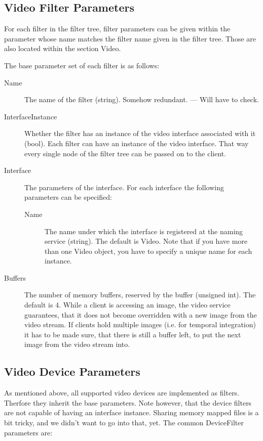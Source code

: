 \subsection{Video Filter Parameters}

For each filter in the filter tree, filter parameters can be given
within the parameter whose name matches the filter name given in the
filter tree. Those are also located within the section Video.

The base parameter set of each filter is as follows:

\begin{description}
\item[Name] The name of the filter (string).
  Somehow redundant. --- Will have to check.
\item[InterfaceInstance] Whether the filter has an instance of the
  video interface associated with it (bool).
  Each filter can have an instance of the video interface. That way
  every single node of the filter tree can be passed on to the client.
\item[Interface] The parameters of the interface. For each interface
  the following parameters can be specified:
  \begin{description}
  \item[Name] The name under which the interface is registered at the
    naming service (string). The default is Video. Note that if
    you have more than one Video object, you have to specify a unique
    name for each instance.
  \end{description}
\item[Buffers] The number of memory buffers, reserved by the buffer
  (unsigned int). The default is 4. While a client is accessing an
  image, the video service guarantees, that it does not become
  overridden with a new image from the video stream. If clients hold
  multiple images (i.e. for temporal integration) it has to be made
  sure, that there is still a buffer left, to put the next image from
  the video stream into.
\end{description}

\subsection{Video Device Parameters}

As mentioned above, all supported video devices are implemented as
filters. Therfore they inherit the base parameters. Note however, that
the device filters are not capable of having an interface
instance. Sharing memory mapped files is a bit tricky, and we didn't
want to go into that, yet. The common DeviceFilter parameters are:

